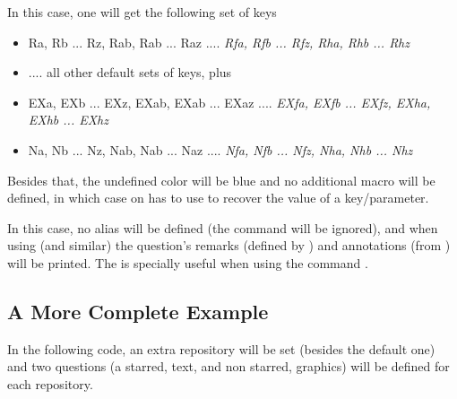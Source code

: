 \documentclass[10pt]{article}
\begin{document}
\begin{codestore}
\usepackage[xtrakeys={EX,N},xtraidx={f,h},undef color={blue},no defs]{tikzquests}
\end{codestore}


In this case, one will get the following set of keys

\begin{itemize}[nosep]
\item Ra, Rb ... Rz, Rab, Rab ... Raz .... \emph{Rfa, Rfb ... Rfz, Rha, Rhb ... Rhz}
\item .... all other default sets of keys, plus
\item EXa, EXb ... EXz, EXab, EXab ... EXaz .... \emph{EXfa, EXfb ... EXfz, EXha, EXhb ... EXhz}
\item Na, Nb ... Nz, Nab, Nab ... Naz .... \emph{Nfa, Nfb ... Nfz, Nha, Nhb ... Nhz}
\end{itemize}

Besides that, the undefined color will be blue and no additional macro will be defined, in which case on has to use \tsobj{\QuestVal} to recover the value of a key/parameter.

\begin{codestore}
\usepackage[no alias, in review]{tikzquests}
\end{codestore}

In this case, no alias will be defined (the command  will be ignored), and when using \tsobj{\tikzQuestion} (and similar) the question's remarks (defined by ) and annotations (from \tsobj{\tikzQuestion}) will be printed. The  is specially useful when using the command \tsobj{\QuestionsList}.

\subsection{A More Complete Example}
In the following code, an extra repository will be set (besides the default one) and two questions (a starred, text, and non starred, graphics) will be defined for each repository.
\end{document}
